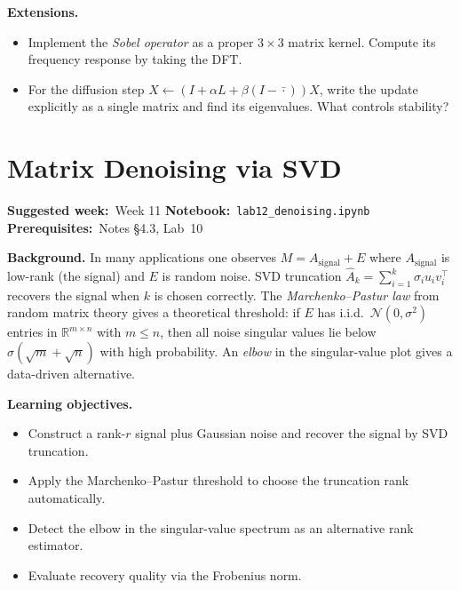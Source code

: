 \documentclass[11pt, a4paper]{article}
\newcommand{\labmeta}[3]{%
  \begin{prereqbox}
  \textbf{Suggested week:}~#1 \quad
  \textbf{Notebook:}~\texttt{#2} \quad
  \textbf{Prerequisites:}~#3
  \end{prereqbox}
  \vspace{4pt}
}
\newcommand{\objectives}[1]{%
  \textbf{\color{prereqcolor}Learning objectives.}\vspace{2pt}
  \begin{itemize}[leftmargin=1.6em, itemsep=1pt] #1 \end{itemize}
}
\newcommand{\extensions}[1]{%
  \textbf{\color{notecolor}Extensions.}
  \begin{itemize}[leftmargin=1.6em, itemsep=1pt] #1 \end{itemize}
}
\begin{document}
\extensions{
  \item Implement the \emph{Sobel operator} as a proper $3\times 3$ matrix kernel.
        Compute its frequency response by taking the DFT.
  \item For the diffusion step $X \leftarrow (I + \alpha L + \beta(I - \bar{\cdot}))X$,
        write the update explicitly as a single matrix and find its eigenvalues.
        What controls stability?
}

\section{Matrix Denoising via SVD}
\label{lab:denoising}

\labmeta{Week 11}{lab12\_denoising.ipynb}{Notes §4.3, Lab~10}

\vspace{4pt}

\noindent\textbf{Background.}
In many applications one observes $M = A_{\text{signal}} + E$ where
$A_{\text{signal}}$ is low-rank (the signal) and $E$ is random noise.
SVD truncation $\hat{A}_k = \sum_{i=1}^k \sigma_i u_i v_i^\top$ recovers the
signal when $k$ is chosen correctly.  The \emph{Marchenko--Pastur law} from
random matrix theory gives a theoretical threshold: if $E$ has i.i.d.\
$\mathcal{N}(0,\sigma^2)$ entries in $\mathbb{R}^{m\times n}$ with $m \leq n$,
then all noise singular values lie below $\sigma(\sqrt{m}+\sqrt{n})$
with high probability.  An \emph{elbow} in the singular-value plot gives a
data-driven alternative.

\objectives{
  \item Construct a rank-$r$ signal plus Gaussian noise and recover the signal by SVD truncation.
  \item Apply the Marchenko--Pastur threshold to choose the truncation rank automatically.
  \item Detect the elbow in the singular-value spectrum as an alternative rank estimator.
  \item Evaluate recovery quality via the Frobenius norm.
}
\end{document}
